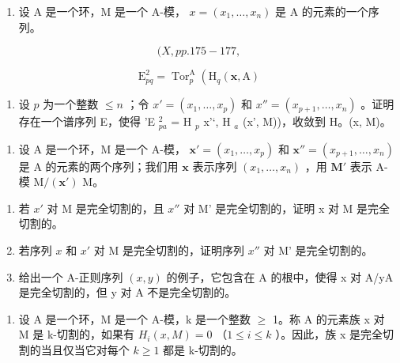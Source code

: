 \begin{enumerate}
\def\labelenumi{\arabic{enumi})}
\setcounter{enumi}{6}
\tightlist
\item
  设 A 是一个环，M 是一个 A-模， \(x = (x_1, \ldots, x_n)\) 是 A 的元素的一个序列。
\end{enumerate}

\[
(X, p p. 1 7 5 - 1 7 7,
\]

\[
\mathrm{E} _ {p q} ^ {2} = \operatorname{Tor} _ {p} ^ {\mathrm{A}} \left(\mathrm{H} _ {q} (\boldsymbol {x}, \mathrm{A}) \right.
\]

\begin{enumerate}
\def\labelenumi{\alph{enumi})}
\setcounter{enumi}{1}
\tightlist
\item
  设 \(p\) 为一个整数 \(\leqslant n\) ；令 \(x' = (x_1, \ldots, x_p)\) 和 \(x'' = (x_{p+1}, \ldots, x_n)\) 。证明存在一个谱序列 E，使得 'E \(_{pa}^{2}\) = H \(_{p}\) x'`, H \(_{a}\) (x', M))，收敛到 H。(x, M)。
\end{enumerate}

\begin{enumerate}
\def\labelenumi{\arabic{enumi})}
\setcounter{enumi}{7}
\tightlist
\item
  设 A 是一个环，M 是一个 A-模， \(\boldsymbol{x}' = (x_1, \ldots, x_p)\) 和 \(\boldsymbol{x}'' = (x_{p+1}, \ldots, x_n)\) 是 A 的元素的两个序列；我们用 \(\boldsymbol{x}\) 表示序列 \((x_1, \ldots, x_n)\) ，用 \(\boldsymbol{M}'\) 表示 A-模 \(\mathrm{M}/(\boldsymbol{x}')\) M。
\end{enumerate}

\begin{enumerate}
\def\labelenumi{\alph{enumi})}
\item
  若 \(x'\) 对 M 是完全切割的，且 \(x''\) 对 M' 是完全切割的，证明 x 对 M 是完全切割的。
\item
  若序列 \(x\) 和 \(x'\) 对 M 是完全切割的，证明序列 \(x''\) 对 M' 是完全切割的。
\item
  给出一个 A-正则序列 \((x, y)\) 的例子，它包含在 A 的根中，使得 x 对 A/yA 是完全切割的，但 y 对 A 不是完全切割的。
\end{enumerate}

\begin{enumerate}
\def\labelenumi{\arabic{enumi})}
\setcounter{enumi}{8}
\tightlist
\item
  设 A 是一个环，M 是一个 A-模，k 是一个整数 \(\geqslant\) 1。称 A 的元素族 x 对 M 是 k-切割的，如果有 \(H_{i}(x, M) = 0\) （\(1 \leqslant i \leqslant k\) ）。因此，族 x 是完全切割的当且仅当它对每个 \(k \geqslant 1\) 都是 k-切割的。
\end{enumerate}

